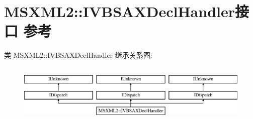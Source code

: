 \hypertarget{interface_m_s_x_m_l2_1_1_i_v_b_s_a_x_decl_handler}{}\section{M\+S\+X\+M\+L2\+:\+:I\+V\+B\+S\+A\+X\+Decl\+Handler接口 参考}
\label{interface_m_s_x_m_l2_1_1_i_v_b_s_a_x_decl_handler}
类 M\+S\+X\+M\+L2\+:\+:I\+V\+B\+S\+A\+X\+Decl\+Handler 继承关系图\+:\begin{figure}[H]
\begin{center}
\leavevmode
\includegraphics[height=2.857143cm]{interface_m_s_x_m_l2_1_1_i_v_b_s_a_x_decl_handler}
\end{center}
\end{figure}
